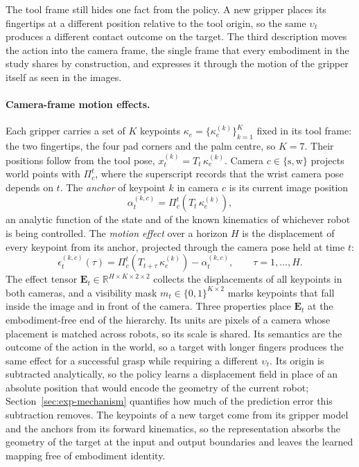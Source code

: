 The tool frame still hides one fact from the policy. A new gripper places its fingertips at a different position relative to the tool origin, so the same $\upsilon_t$ produces a different contact outcome on the target. The third description moves the action into the camera frame, the single frame that every embodiment in the study shares by construction, and expresses it through the motion of the gripper itself as seen in the images.

\paragraph{Camera-frame motion effects.}
Each gripper carries a set of $K$ keypoints $\kappa_e = \{\kappa_e^{(k)}\}_{k=1}^{K}$ fixed in its tool frame: the two fingertips, the four pad corners and the palm centre, so $K = 7$. Their positions follow from the tool pose, $x_t^{(k)} = T_t\,\kappa_e^{(k)}$. Camera $c \in \{\mathrm{s}, \mathrm{w}\}$ projects world points with $\Pi_c^{t}$, where the superscript records that the wrist camera pose depends on $t$. The \emph{anchor} of keypoint $k$ in camera $c$ is its current image position
\begin{equation}
\alpha_t^{(k,c)} = \Pi_c^{t}\!\left(T_t\,\kappa_e^{(k)}\right),
\label{eq:anchor}
\end{equation}
an analytic function of the state and of the known kinematics of whichever robot is being controlled. The \emph{motion effect} over a horizon $H$ is the displacement of every keypoint from its anchor, projected through the camera pose held at time $t$:
\begin{equation}
\epsilon_t^{(k,c)}(\tau) = \Pi_c^{t}\!\left(T_{t+\tau}\,\kappa_e^{(k)}\right) - \alpha_t^{(k,c)}, \qquad \tau = 1,\dots,H .
\label{eq:effect}
\end{equation}
The effect tensor $\mathbf{E}_t \in \mathbb{R}^{H \times K \times 2 \times 2}$ collects the displacements of all keypoints in both cameras, and a visibility mask $m_t \in \{0,1\}^{K \times 2}$ marks keypoints that fall inside the image and in front of the camera. Three properties place $\mathbf{E}_t$ at the embodiment-free end of the hierarchy. Its units are pixels of a camera whose placement is matched across robots, so its scale is shared. Its semantics are the outcome of the action in the world, so a target with longer fingers produces the same effect for a successful grasp while requiring a different $\upsilon_t$. Its origin is subtracted analytically, so the policy learns a displacement field in place of an absolute position that would encode the geometry of the current robot; Section~\ref{sec:exp-mechanism} quantifies how much of the prediction error this subtraction removes. The keypoints of a new target come from its gripper model and the anchors from its forward kinematics, so the representation absorbs the geometry of the target at the input and output boundaries and leaves the learned mapping free of embodiment identity.

